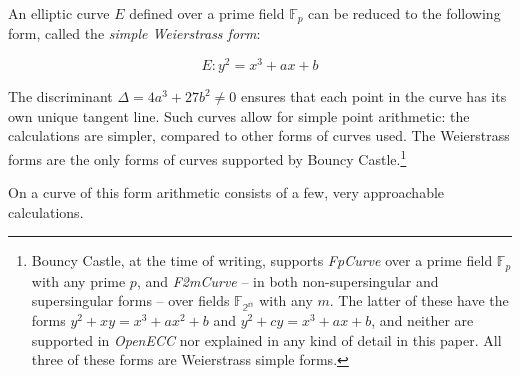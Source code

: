 An elliptic curve \(E\) defined over a prime field \(\mathbb{F}_p\) can be reduced to the following form,
called the \emph{simple Weierstrass form}:

\begin{equation}
	E: y^2 = x^3 + ax + b
\end{equation}

The discriminant \(\Delta = 4a^3 + 27b^2 \neq 0\) ensures that each point in the curve has its own
unique tangent line. Such curves allow for simple point arithmetic: the
calculations are simpler, compared to other forms of curves used. The Weierstrass forms are
the only forms of curves supported by Bouncy Castle.\footnote{Bouncy Castle, at the time of writing,
supports \emph{FpCurve} over a prime field \(\mathbb{F}_p\) with any prime \(p\), and \emph{F2mCurve}
-- in both non-supersingular and supersingular forms -- over fields \(\mathbb{F_{2^m}}\) with any \(m\).
The latter of these have the forms \(y^2 + xy = x^3 + ax^2 + b\) and
\(y^2 + cy = x^3 + ax + b\), and neither are supported in \emph{OpenECC} nor explained in any kind
of detail in this paper. All three of these forms are Weierstrass simple forms.\cite{bouncycastle}}

On a curve of this form arithmetic consists of a few, very approachable calculations.
